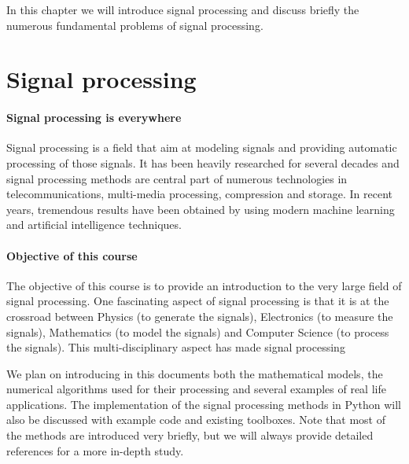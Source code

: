 
In this chapter we will introduce signal processing and discuss briefly the
numerous fundamental problems of signal processing. 

\section{Signal processing}
\label{sec:sigpro-intro}


\paragraph{Signal processing is everywhere}
Signal processing is a field that aim at modeling signals and providing automatic
processing of those signals. 
It has been heavily researched for several decades
and signal processing methods are central part of numerous technologies in
telecommunications, multi-media processing, compression and storage. 
In recent
years, tremendous results have been obtained by using modern machine learning
and artificial intelligence techniques.

\paragraph{Objective of this course} The objective of this course is to provide
an introduction to the very large field of signal processing. 
One fascinating
aspect of signal processing is that it is at the crossroad between Physics (to
generate the signals), Electronics (to measure the signals), Mathematics (to
model the signals) and Computer Science (to process the signals). This
multi-disciplinary aspect has made signal processing 

We plan on
introducing in this documents both the mathematical models, the numerical
algorithms used for their processing and several examples of real life
applications. The implementation of the signal processing methods in Python will
also be discussed with example code and existing
toolboxes. Note that most of the methods are introduced very briefly, but we
will always provide detailed references for a more in-depth study.



